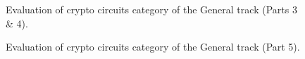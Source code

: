 \begin{figure}
	\noindent{}
	\caption{Evaluation of crypto circuits category of the General track (Parts 3 \& 4).}
	\label{fig:crci-2}
\end{figure}
	
\begin{figure}
	\noindent{}
	\caption{Evaluation of crypto circuits category of the General track (Part 5).}
	\label{fig:crci-5}
\end{figure}
	

